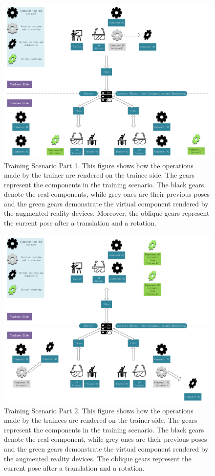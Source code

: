 \begin{figure}
	\centering
	\includegraphics[width=\textwidth]{figures/scenario1.pdf}
	\caption{Training Scenario Part 1. This figure shows how the operations made by the trainer are rendered on the trainee side. The gears represent the components in the training scenario. The black gears denote the real components, while grey ones are their previous poses and the green gears demonstrate the virtual component rendered by the augmented reality devices. Moreover, the oblique gears represent the current pose after a translation and a rotation.}
	\label{fig:scenario1}
\end{figure}

\begin{figure}
	\centering
	\includegraphics[width=\textwidth]{figures/scenario2.pdf}
	\caption{Training Scenario Part 2. This figure shows how the operations made by the trainees are rendered on the trainer side. The gears represent the components in the training scenario. The black gears denote the real component, while grey ones are their previous poses and the green gears demonstrate the virtual component rendered by the augmented reality devices. The oblique gears represent the current pose after a translation and a rotation.}
	\label{fig:scenario2}
\end{figure}

